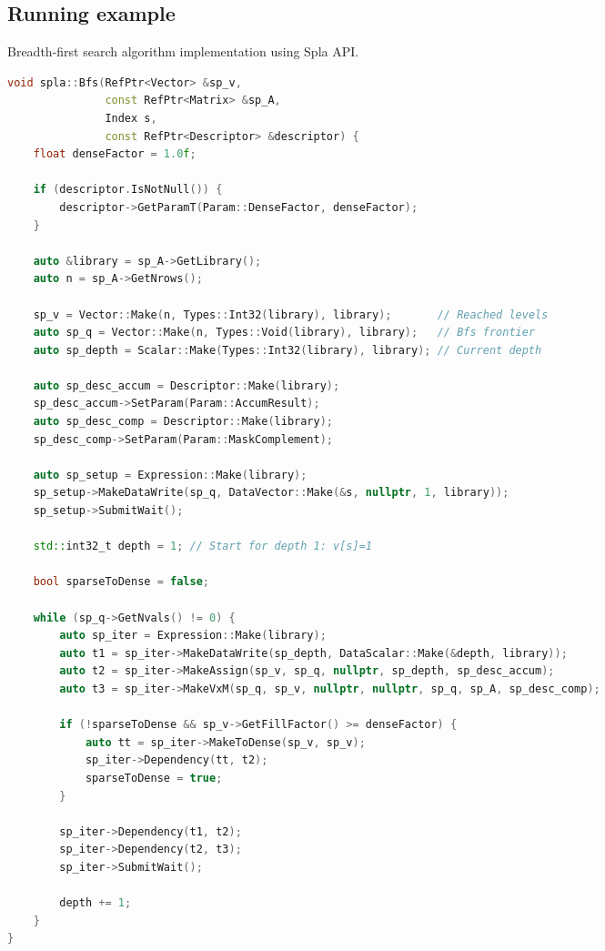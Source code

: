 
\subsection{Running example}

\lstset{style=codelistingstyle}

\begin{algorithm}[]
\caption{Breadth-first search algorithm implementation using Spla API.}
\label{alg:spla_bfs_example}
\begin{lstlisting}[language=C++]
void spla::Bfs(RefPtr<Vector> &sp_v, 
               const RefPtr<Matrix> &sp_A, 
               Index s, 
               const RefPtr<Descriptor> &descriptor) {
    float denseFactor = 1.0f;

    if (descriptor.IsNotNull()) {
        descriptor->GetParamT(Param::DenseFactor, denseFactor);
    }

    auto &library = sp_A->GetLibrary();
    auto n = sp_A->GetNrows();

    sp_v = Vector::Make(n, Types::Int32(library), library);       // Reached levels
    auto sp_q = Vector::Make(n, Types::Void(library), library);   // Bfs frontier
    auto sp_depth = Scalar::Make(Types::Int32(library), library); // Current depth

    auto sp_desc_accum = Descriptor::Make(library);
    sp_desc_accum->SetParam(Param::AccumResult);
    auto sp_desc_comp = Descriptor::Make(library);
    sp_desc_comp->SetParam(Param::MaskComplement);

    auto sp_setup = Expression::Make(library);
    sp_setup->MakeDataWrite(sp_q, DataVector::Make(&s, nullptr, 1, library));
    sp_setup->SubmitWait();

    std::int32_t depth = 1; // Start for depth 1: v[s]=1

    bool sparseToDense = false;

    while (sp_q->GetNvals() != 0) {
        auto sp_iter = Expression::Make(library);
        auto t1 = sp_iter->MakeDataWrite(sp_depth, DataScalar::Make(&depth, library));
        auto t2 = sp_iter->MakeAssign(sp_v, sp_q, nullptr, sp_depth, sp_desc_accum);
        auto t3 = sp_iter->MakeVxM(sp_q, sp_v, nullptr, nullptr, sp_q, sp_A, sp_desc_comp);

        if (!sparseToDense && sp_v->GetFillFactor() >= denseFactor) {
            auto tt = sp_iter->MakeToDense(sp_v, sp_v);
            sp_iter->Dependency(tt, t2);
            sparseToDense = true;
        }

        sp_iter->Dependency(t1, t2);
        sp_iter->Dependency(t2, t3);
        sp_iter->SubmitWait();

        depth += 1;
    }
}
\end{lstlisting}
\end{algorithm}

